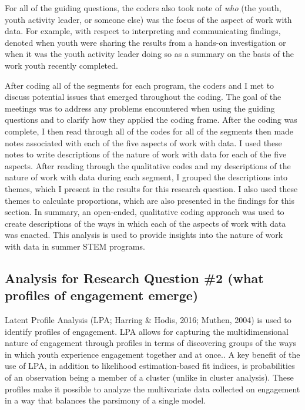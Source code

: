 \documentclass[]{book}
\theoremstyle{definition}
\theoremstyle{definition}
\theoremstyle{definition}
\theoremstyle{remark}
\begin{document}
For all of the guiding questions, the coders also took note of
\emph{who} (the youth, youth activity leader, or someone else) was the
focus of the aspect of work with data. For example, with respect to
interpreting and communicating findings, denoted when youth were sharing
the results from a hands-on investigation or when it was the youth
activity leader doing so as a summary on the basis of the work youth
recently completed.

After coding all of the segments for each program, the coders and I met
to discuss potential issues that emerged throughout the coding. The goal
of the meetings was to address any problems encountered when using the
guiding questions and to clarify how they applied the coding frame.
After the coding was complete, I then read through all of the codes for
all of the segments then made notes associated with each of the five
aspects of work with data. I used these notes to write descriptions of
the nature of work with data for each of the five aspects. After reading
through the qualitative codes and my descriptions of the nature of work
with data during each segment, I grouped the descriptions into themes,
which I present in the results for this research question. I also used
these themes to calculate proportions, which are also presented in the
findings for this section. In summary, an open-ended, qualitative coding
approach was used to create descriptions of the ways in which each of
the aspects of work with data was enacted. This analysis is used to
provide insights into the nature of work with data in summer STEM
programs.

\subsection{Analysis for Research Question \#2 (what profiles of
engagement
emerge)}\label{analysis-for-research-question-2-what-profiles-of-engagement-emerge}

Latent Profile Analysis (LPA; Harring \& Hodis, 2016; Muthen, 2004) is
used to identify profiles of engagement. LPA allows for capturing the
multidimensional nature of engagement through profiles in terms of
discovering groups of the ways in which youth experience engagement
together and at once.. A key benefit of the use of LPA, in addition to
likelihood estimation-based fit indices, is probabilities of an
observation being a member of a cluster (unlike in cluster analysis).
These profiles make it possible to analyze the multivariate data
collected on engagement in a way that balances the parsimony of a single
model.
\end{document}

